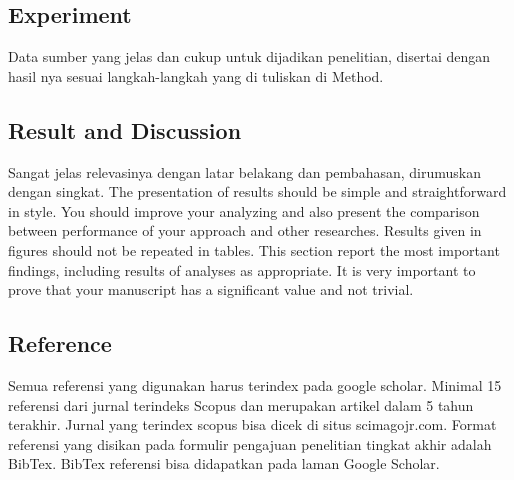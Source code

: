 \subsection{Experiment}
Data sumber yang jelas dan cukup untuk dijadikan penelitian, disertai dengan hasil nya sesuai langkah-langkah yang di tuliskan di Method.

\subsection{Result and Discussion}
Sangat jelas relevasinya dengan latar belakang dan pembahasan, dirumuskan dengan singkat. The presentation of results should be simple and straightforward in style. You should improve your analyzing and also present the comparison between performance of your approach and other researches. Results given in figures should not be repeated in tables. This section report the most important findings, including results of analyses as appropriate. It is very important to prove that your manuscript has a significant value and not trivial.

\subsection{Reference}
Semua  referensi  yang  digunakan  harus  terindex  pada  google  scholar.   Minimal  15 referensi dari jurnal terindeks Scopus dan merupakan artikel dalam 5 tahun terakhir. Jurnal yang terindex scopus bisa dicek di situs scimagojr.com.  Format referensi yang disikan  pada  formulir  pengajuan  penelitian  tingkat  akhir  adalah  BibTex.   BibTex referensi bisa didapatkan pada laman Google Scholar.

